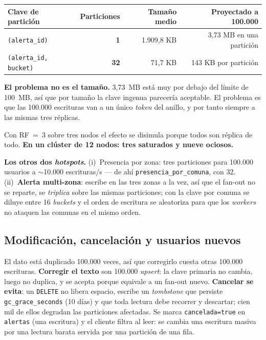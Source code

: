 \documentclass[11pt,a4paper]{article}
\begin{document}
\begin{center}\small
\begin{tabular}{@{}lrrr@{}}
\toprule
\textbf{Clave de partición} & \textbf{Particiones} & \textbf{Tamaño medio} & \textbf{Proyectado a 100.000} \\
\midrule
\texttt{(alerta\_id)} & \textcolor{rojo}{\textbf{1}} & 1.909,8 KB & \textcolor{rojo}{3,73 MB en una partición} \\
\texttt{(alerta\_id, bucket)} & \textcolor{verde}{\textbf{32}} & 71,7 KB & \textcolor{verde}{143 KB por partición} \\
\bottomrule
\end{tabular}
\end{center}

\begin{ojo}
\textbf{El problema no es el tamaño.} 3,73~MB está muy por debajo del límite de 100~MB,
así que por tamaño la clave ingenua parecería aceptable. El problema es que las 100.000
escrituras van a un único \emph{token} del anillo, y por tanto siempre a las mismas tres
réplicas.

\smallskip
Con RF~=~3 sobre tres nodos el efecto se disimula porque todos son réplica de todo.
\textbf{En un clúster de 12 nodos: tres saturados y nueve ociosos.}
\end{ojo}

\smallskip
\noindent\textbf{Los otros dos \emph{hotspots}.} (i)~Presencia por zona: tres
particiones para 100.000 usuarios a $\sim$10.000 escrituras/s — de ahí
\texttt{presencia\_por\_comuna}, con 32. (ii)~\textbf{Alerta multi-zona}: escribe
en las tres zonas a la vez, así que el fan-out no se reparte, se \emph{triplica}
sobre las mismas particiones; con la clave por comuna se diluye entre 16
\emph{buckets} y el orden de escritura se aleatoriza para que los \emph{workers} no
ataquen las comunas en el mismo orden.

\subsection{Modificación, cancelación y usuarios nuevos}
El dato está duplicado 100.000 veces, así que corregirlo cuesta otras 100.000
escrituras. \textbf{Corregir el texto} son 100.000 \emph{upsert}: la clave primaria
no cambia, luego no duplica, y se acepta porque equivale a un fan-out nuevo.
\textbf{Cancelar se evita}: un \texttt{DELETE} no libera espacio, escribe un
\emph{tombstone} que persiste \texttt{gc\_grace\_seconds} (10 días) y que toda
lectura debe recorrer y descartar; cien mil de ellos degradan las particiones
afectadas. Se marca \texttt{cancelada=true} en \texttt{alertas} (una escritura) y
el cliente filtra al leer: se cambia una escritura masiva por una lectura barata
servida por una partición de una fila.
\end{document}

